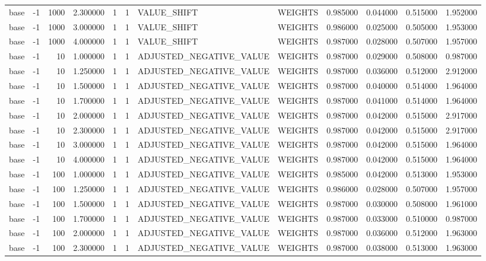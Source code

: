 \begin{tabular}{lrrrllllrrrr}
base & -1 & 1000 & 2.300000 & 1 & 1 & VALUE_SHIFT & WEIGHTS & 0.985000 & 0.044000 & 0.515000 & 1.952000 \\
base & -1 & 1000 & 3.000000 & 1 & 1 & VALUE_SHIFT & WEIGHTS & 0.986000 & 0.025000 & 0.505000 & 1.953000 \\
base & -1 & 1000 & 4.000000 & 1 & 1 & VALUE_SHIFT & WEIGHTS & 0.987000 & 0.028000 & 0.507000 & 1.957000 \\
base & -1 & 10 & 1.000000 & 1 & 1 & ADJUSTED_NEGATIVE_VALUE & WEIGHTS & 0.987000 & 0.029000 & 0.508000 & 0.987000 \\
base & -1 & 10 & 1.250000 & 1 & 1 & ADJUSTED_NEGATIVE_VALUE & WEIGHTS & 0.987000 & 0.036000 & 0.512000 & 2.912000 \\
base & -1 & 10 & 1.500000 & 1 & 1 & ADJUSTED_NEGATIVE_VALUE & WEIGHTS & 0.987000 & 0.040000 & 0.514000 & 1.964000 \\
base & -1 & 10 & 1.700000 & 1 & 1 & ADJUSTED_NEGATIVE_VALUE & WEIGHTS & 0.987000 & 0.041000 & 0.514000 & 1.964000 \\
base & -1 & 10 & 2.000000 & 1 & 1 & ADJUSTED_NEGATIVE_VALUE & WEIGHTS & 0.987000 & 0.042000 & 0.515000 & 2.917000 \\
base & -1 & 10 & 2.300000 & 1 & 1 & ADJUSTED_NEGATIVE_VALUE & WEIGHTS & 0.987000 & 0.042000 & 0.515000 & 2.917000 \\
base & -1 & 10 & 3.000000 & 1 & 1 & ADJUSTED_NEGATIVE_VALUE & WEIGHTS & 0.987000 & 0.042000 & 0.515000 & 1.964000 \\
base & -1 & 10 & 4.000000 & 1 & 1 & ADJUSTED_NEGATIVE_VALUE & WEIGHTS & 0.987000 & 0.042000 & 0.515000 & 1.964000 \\
base & -1 & 100 & 1.000000 & 1 & 1 & ADJUSTED_NEGATIVE_VALUE & WEIGHTS & 0.985000 & 0.042000 & 0.513000 & 1.953000 \\
base & -1 & 100 & 1.250000 & 1 & 1 & ADJUSTED_NEGATIVE_VALUE & WEIGHTS & 0.986000 & 0.028000 & 0.507000 & 1.957000 \\
base & -1 & 100 & 1.500000 & 1 & 1 & ADJUSTED_NEGATIVE_VALUE & WEIGHTS & 0.987000 & 0.030000 & 0.508000 & 1.961000 \\
base & -1 & 100 & 1.700000 & 1 & 1 & ADJUSTED_NEGATIVE_VALUE & WEIGHTS & 0.987000 & 0.033000 & 0.510000 & 0.987000 \\
base & -1 & 100 & 2.000000 & 1 & 1 & ADJUSTED_NEGATIVE_VALUE & WEIGHTS & 0.987000 & 0.036000 & 0.512000 & 1.963000 \\
base & -1 & 100 & 2.300000 & 1 & 1 & ADJUSTED_NEGATIVE_VALUE & WEIGHTS & 0.987000 & 0.038000 & 0.513000 & 1.963000 \\

\end{tabular}
